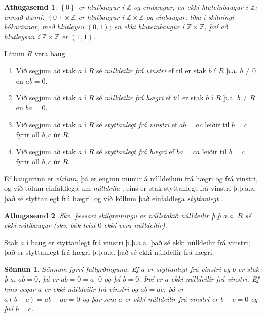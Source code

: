 \documentclass[a4paper,icelandic,11pt]{book}
\theoremstyle{plain}
\newtheorem*{ath}{Athugasemd}
\newtheorem*{sonnun}{Sönnun}
\newcommand{\Z}{\mathbb{Z}}
\begin{document}
\begin{ath}
  $\left\{ 0 \right\}$ er hlutbaugur í $\Z$ og einbaugur, en ekki hluteinbaugur
  í $\Z$; annað dæmi: $\left\{ 0 \right\}\times\Z$ er hlutbaugur í $\Z\times\Z$
  og einbaugur, \emph{líka} í skilningi bókarinnar, með hlutleysu $(0,1)$; en 
  ekki hluteinbaugur í $\Z\times\Z$, því að hlutleysan í $\Z\times\Z$ er 
  $(1,1)$.
\end{ath}
\begin{skilgr}
  Látum $R$ vera baug. 
  \begin{enumerate}[(1)]
    \item Við segjum að stak $a$ í $R$ sé \emph{núlldeilir frá vinstri}
       ef til er stak $b$ í $R$ þ.a. $b\neq 0$
      en $ab = 0$.
    \item Við segjum að stak $a$ í $R$ sé \emph{núlldeilir frá hægri}
       ef til er stak $b$ í $R$ þ.a. $b\neq R$
      en $ba = 0$.
    \item Við segjum að stak $a$ í $R$ sé \emph{styttanlegt frá vinstri}
       ef $ab = ac$ leiðir til $b=c$ fyrir
      öll $b,c$ úr $R$.
    \item Við segjum að stak $a$ í $R$ sé \emph{styttanlegt frá hægri}
       ef $ba = ca$ leiðir til $b=c$ fyrir öll 
      $b,c$ úr $R$.
  \end{enumerate}
  Ef baugurinn er \emph{víxlinn}, þá er enginn munur á núlldeilum frá hægri
  og frá vinstri, og við tölum einfaldlega um \emph{núlldeila}
  ; eins er stak styttanlegt frá vinstri þ.þ.a.a. það sé 
  styttanlegt frá hægri; og við köllum það einfaldlega \emph{styttanlegt}
  .
\end{skilgr}
\begin{ath}
  Skv. þessari skilgreiningu er núllstakið núlldeilir þ.þ.a.a. $R$ sé ekki
  núllbaugur (skv. bók telst $0$ ekki vera núlldeilir).
\end{ath}
\begin{setn}
  Stak $a$ í baug er styttanlegt frá vinstri þ.þ.a.a. það sé ekki núlldeilir
  frá vinstri; það er styttanlegt frá hægri þ.þ.a.a. það sé ekki núlldeilir
  frá hægri.
\end{setn}
\begin{sonnun}
  Sönnum fyrri fullyrðinguna. Ef $a$ er styttanlegt frá vinstri og $b$ er stak
  þ.a. $ab = 0$, þá er $ab = 0 = a\cdot 0$ og þá $b = 0$. Því er $a$ ekki
  núlldeilir frá vinstri. Ef hins vegar $a$ er ekki núlldeilir frá vinstri og
  $ab = ac$, þá er $a(b-c) = ab - ac = 0$ og þar sem $a$ er ekki núlldeilir
  frá vinstri er $b - c = 0$ og því $b = c$. 
\end{sonnun}
\end{document}
